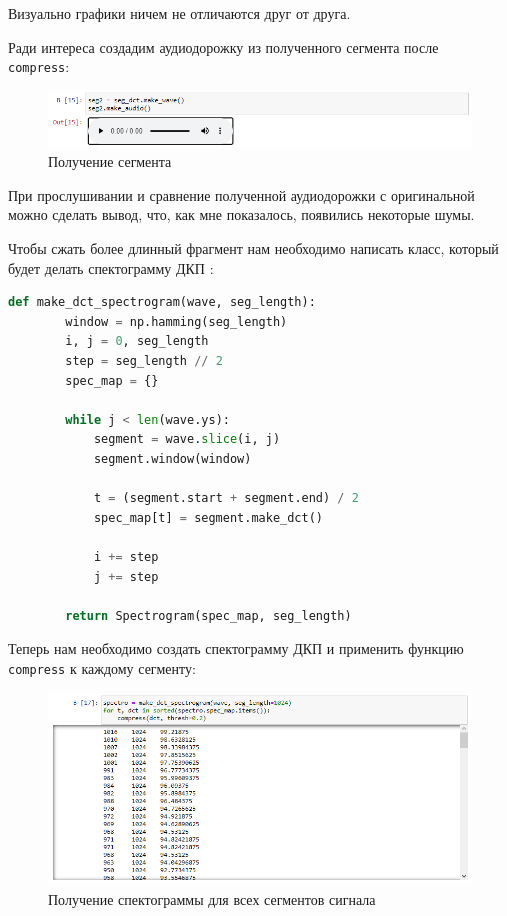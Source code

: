 \documentclass[a4paper]{article}
\begin{document}
            Визуально графики ничем не отличаются друг от друга. 
            
            Ради интереса создадим аудиодорожку из полученного сегмента после \\ \texttt{compress}:
            
            \begin{figure}[H]
                \centering
                \includegraphics[width=\textwidth]{ex_2_segment_dct_compress_audio.png}
                \caption{Получение сегмента}
                \label{fig:ex_2_segment_dct_compress_audio}
            \end{figure}
            
            При прослушивании и сравнение полученной аудиодорожки с оригинальной можно сделать вывод, что, как мне показалось, появились некоторые шумы.
            
            Чтобы сжать более длинный фрагмент нам необходимо написать класс, который будет делать спектограмму ДКП :
            
\begin{lstlisting}[language=Python, caption= Класс \texttt{make-dct-spectrogram}]
    def make_dct_spectrogram(wave, seg_length):
        window = np.hamming(seg_length)
        i, j = 0, seg_length
        step = seg_length // 2
        spec_map = {}
    
        while j < len(wave.ys):
            segment = wave.slice(i, j)
            segment.window(window)
    
            t = (segment.start + segment.end) / 2
            spec_map[t] = segment.make_dct()
    
            i += step
            j += step
    
        return Spectrogram(spec_map, seg_length)
\end{lstlisting} 
            
            Теперь нам необходимо создать спектограмму ДКП и применить функцию \texttt{compress} к каждому сегменту:
            
            \begin{figure}[H]
                \centering
                \includegraphics[width=\textwidth]{ex_2_spectogramma.png}
                \caption{Получение спектограммы для всех сегментов сигнала}
                \label{fig:ex_2_spectogramma}
            \end{figure}
            
\end{document}
